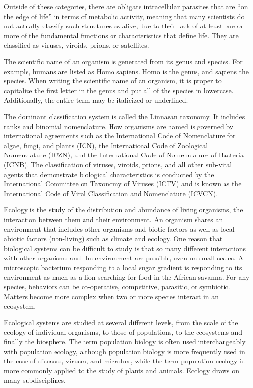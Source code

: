 Outside of these categories, there are obligate intracellular parasites that are ``on the edge of life'' in terms of metabolic activity, meaning that many scientists do not actually classify such structures as alive, due to their lack of at least one or more of the fundamental functions or characteristics that define life. They are classified as viruses, viroids, prions, or satellites.

The scientific name of an organism is generated from its genus and species. For example, humans are listed as Homo sapiens. Homo is the genus, and sapiens the species. When writing the scientific name of an organism, it is proper to capitalize the first letter in the genus and put all of the species in lowercase. Additionally, the entire term may be italicized or underlined.

The dominant classification system is called the \href{https://en.wikipedia.org/wiki/Linnaean_taxonomy}{Linnaean taxonomy}. It includes ranks and binomial nomenclature. How organisms are named is governed by international agreements such as the International Code of Nomenclature for algae, fungi, and plants (ICN), the International Code of Zoological Nomenclature (ICZN), and the International Code of Nomenclature of Bacteria (ICNB). The classification of viruses, viroids, prions, and all other sub-viral agents that demonstrate biological characteristics is conducted by the International Committee on Taxonomy of Viruses (ICTV) and is known as the International Code of Viral Classification and Nomenclature (ICVCN).

\href{https://en.wikipedia.org/wiki/Ecology}{Ecology} is the study of the distribution and abundance of living organisms, the interaction between them and their environment. An organism shares an environment that includes other organisms and biotic factors as well as local abiotic factors (non-living) such as climate and ecology. One reason that biological systems can be difficult to study is that so many different interactions with other organisms and the environment are possible, even on small scales. A microscopic bacterium responding to a local sugar gradient is responding to its environment as much as a lion searching for food in the African savanna. For any species, behaviors can be co-operative, competitive, parasitic, or symbiotic. Matters become more complex when two or more species interact in an ecosystem.

Ecological systems are studied at several different levels, from the scale of the ecology of individual organisms, to those of populations, to the ecosystems and finally the biosphere. The term population biology is often used interchangeably with population ecology, although population biology is more frequently used in the case of diseases, viruses, and microbes, while the term population ecology is more commonly applied to the study of plants and animals. Ecology draws on many subdisciplines.

